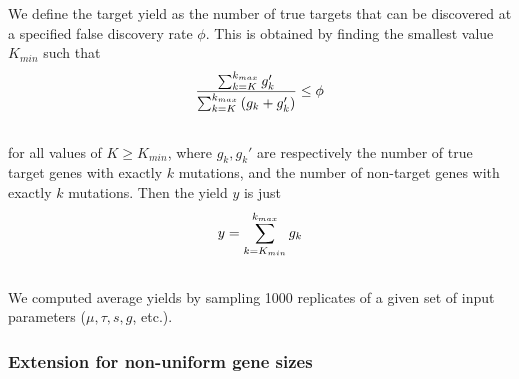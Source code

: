 \documentclass[letterpaper,10pt,english]{howto}
\begin{document}
We define the target yield as the number of true targets that
can be discovered at a specified false discovery rate $\phi$.
This is obtained by finding the smallest value $K_{min}$ such that
\begin{gather}
\begin{split}\frac{\sum_{k=K}^{k_{max}}{g_k'}}
{\sum_{k=K}^{k_{max}}{(g_k+g_k')}} \le \phi\end{split}\notag\\\begin{split}\end{split}\notag
\end{gather}
for all values of $K \ge K_{min}$,
where $g_k,g_k'$ are respectively the number of true
target genes with exactly $k$ mutations, and the number of
non-target genes with exactly $k$ mutations.
Then the yield $y$ is just
\begin{gather}
\begin{split}y = \sum_{k=K_{min}}^{k_{max}}{g_k}\end{split}\notag\\\begin{split}\end{split}\notag
\end{gather}
We computed average yields by sampling 1000 replicates of
a given set of input parameters  ($\mu, \tau, s, g$, etc.).


\subsubsection{Extension for non-uniform gene sizes}
\end{document}
